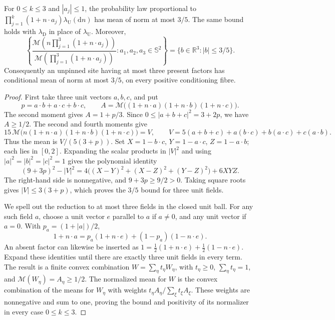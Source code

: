 \begin{lemma}\label{l:35}
For \(0\le k\le3\) and \(|a_j|\le1\), the probability law proportional to
\(\prod_{j=1}^k(1+n\cdot a_j)\lambda_{\mathrm U}(\mathrm dn)\)
has mean of norm at most \(3/5\). The same bound holds with
\(\lambda_{\mathrm D}\) in place of \(\lambda_{\mathrm U}\).
Moreover,
\[
 \left\{
 \frac{\mathcal M\!\left(n\prod_{j=1}^3(1+n\cdot a_j)\right)}
      {\mathcal M\!\left(\prod_{j=1}^3(1+n\cdot a_j)\right)}
       :a_1,a_2,a_3\in\mathbb S^2
 \right\}=\{b\in\mathbb R^3:|b|\le3/5\}.
\]
Consequently an unpinned site having at most three present factors
has conditional mean of norm at most \(3/5\), on every positive
conditioning fibre.
\end{lemma}

\begin{proof}
First take three unit vectors \(a,b,c\), and put
\[
 p=a\cdot b+a\cdot c+b\cdot c,\qquad
 A=\mathcal M\bigl((1+n\cdot a)(1+n\cdot b)(1+n\cdot c)\bigr).
\]
The second moment gives \(A=1+p/3\). Since
\(0\le|a+b+c|^2=3+2p\), we have \(A\ge1/2\).
The second and fourth moments give
\[
 15\,\mathcal M\bigl(n(1+n\cdot a)(1+n\cdot b)(1+n\cdot c)\bigr)
 =V,\qquad
 V=5(a+b+c)+a(b\cdot c)+b(a\cdot c)+c(a\cdot b).
\]
Thus the mean is \(V/(5(3+p))\). Set
\(X=1-b\cdot c\), \(Y=1-a\cdot c\), \(Z=1-a\cdot b\);
each lies in \([0,2]\). Expanding the scalar products in \(|V|^2\)
and using \(|a|^2=|b|^2=|c|^2=1\) gives the polynomial identity
\[
 (9+3p)^2-|V|^2
 =4\bigl((X-Y)^2+(X-Z)^2+(Y-Z)^2\bigr)+6XYZ.
\]
The right-hand side is nonnegative, and \(9+3p\ge9/2>0\).
Taking square roots gives \(|V|\le3(3+p)\), which proves the
\(3/5\) bound for three unit fields.

We spell out the reduction to at most three fields in the closed
unit ball. For any such field \(a\), choose a unit vector \(e\)
parallel to \(a\) if \(a\ne0\), and any unit vector if \(a=0\).
With \(p_a=(1+|a|)/2\),
\[
 1+n\cdot a=p_a(1+n\cdot e)+(1-p_a)(1-n\cdot e).
\]
An absent factor can likewise be inserted as
\(1=\tfrac12(1+n\cdot e)+\tfrac12(1-n\cdot e)\).
Expand these identities until there are exactly three unit fields
in every term. The result is a finite convex combination
\(W=\sum_\eta t_\eta W_\eta\), with \(t_\eta\ge0\),
\(\sum_\eta t_\eta=1\), and
\(\mathcal M(W_\eta)=A_\eta\ge1/2\). The normalized mean for \(W\)
is the convex combination of the means for \(W_\eta\) with weights
\(t_\eta A_\eta/\sum_\xi t_\xi A_\xi\).
These weights are nonnegative and sum to one, proving the bound
and positivity of its normalizer in every case \(0\le k\le3\).


\end{proof}
